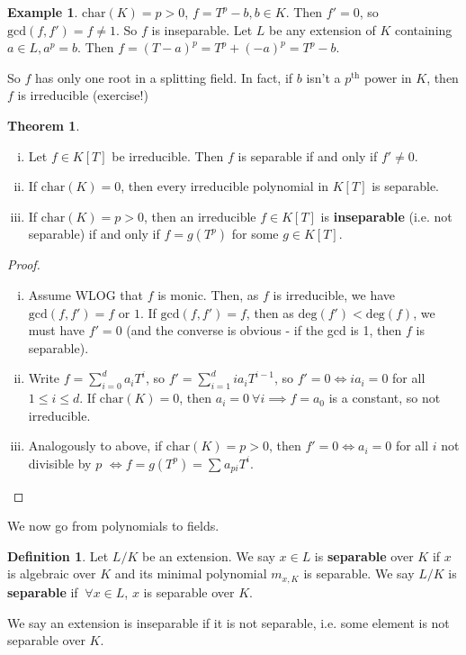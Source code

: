 \documentclass{article}
\theoremstyle{definition}
\newtheorem{theorem}{Theorem}[section]
\newtheorem{example}{Example}[section]
\newtheorem{defn}{Definition}[section]
\begin{document}
\begin{example}
    $\text{char}(K)=p>0$, $f = T^p - b, b \in K$. Then $f'=0$, so $\text{gcd}(f,f')=f \neq 1$. So $f$ is inseparable. Let $L$ be any extension of $K$ containing $a \in L, a^p = b$. Then $f=(T-a)^p = T^p + (-a)^p = T^p - b$. 

    So $f$ has only one root in a splitting field. In fact, if $b$ isn't a $p^{\text{th}}$ power in $K$, then $f$ is irreducible (exercise!)
\end{example}
\begin{theorem}
    \begin{enumerate}[(i)]
        \item Let $f \in K[T]$ be irreducible. Then $f$ is separable if and only if $f' \neq 0$. 
        \item If $\text{char}(K)=0$, then every irreducible polynomial in $K[T]$ is separable.
        \item If $\text{char}(K)=p>0$, then an irreducible $f \in K[T]$ is \textbf{inseparable} (i.e. not separable) if and only if $f=g(T^p)$ for some $g \in K[T]$.
    \end{enumerate}
\end{theorem}
\begin{proof}
    \begin{enumerate}[(i)]
        \item Assume WLOG that $f$ is monic. Then, as $f$ is irreducible, we have $\text{gcd}(f,f') = f$ or $1$. If $\text{gcd}(f,f')=f$, then as $\text{deg}(f')<\text{deg}(f)$, we must have $f'=0$ (and the converse is obvious - if the gcd is 1, then $f$ is separable).
        \item Write $f = \sum_{i=0}^{d} a_iT^i$, so $f' = \sum_{i=1}^{d} ia_iT^{i-1}$, so $f'=0 \iff ia_i = 0$ for all $1\le i\le d$. If $\text{char}(K)=0$, then $a_i=0 ~\forall i \implies f = a_0$ is a constant, so not irreducible.
        \item Analogously to above, if $\text{char}(K)=p>0$, then $f'=0 \iff a_i=0$ for all $i$ not divisible by $p$ $\iff f=g(T^p) = \sum_{}^{} a_{pi}T^i$. 
    \end{enumerate}
\end{proof}
We now go from polynomials to fields.
\begin{defn}
    Let $L/K$ be an extension. We say $x \in L$ is \textbf{separable} over $K$ if $x$ is algebraic over $K$ and its minimal polynomial $m_{x,K}$ is separable. We say $L/K$ is \textbf{separable} if $~\forall x \in L$, $x$ is separable over $K$. 
    
    We say an extension is inseparable if it is not separable, i.e. some element is not separable over $K$.
\end{defn}
\end{document}
